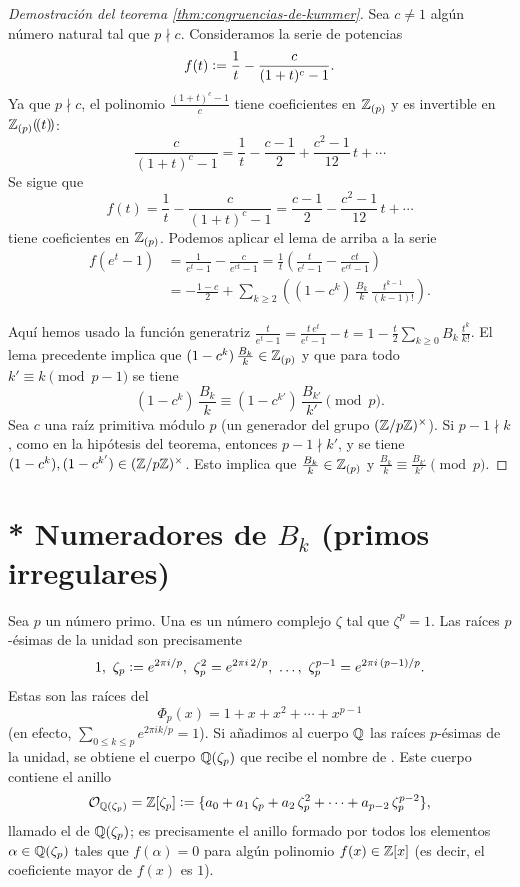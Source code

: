 \documentclass{article}
\numberwithin{equation}{section}
\theoremstyle{definition}
\begin{document}
\begin{proof}[Demostración del teorema \ref{thm:congruencias-de-kummer}]
  Sea $c \ne 1$ algún número natural tal que $p \nmid c$. Consideramos la serie
  de potencias
  $$f (t) \mathrel{\mathop:}= \frac{1}{t} - \frac{c}{(1+t)^c - 1}.$$
  Ya que $p \nmid c$, el polinomio $\frac{(1+t)^c - 1}{c}$ tiene coeficientes en
  $\mathbb{Z}_{(p)}$ y es invertible en $\mathbb{Z}_{(p)} (\!(t)\!)$:
  $$\frac{c}{(1+t)^c - 1} = \frac{1}{t} - \frac{c-1}{2} + \frac{c^2 - 1}{12}\,t + \cdots$$
  Se sigue que
  $$f (t) = \frac{1}{t} - \frac{c}{(1+t)^c - 1} = \frac{c-1}{2} - \frac{c^2 - 1}{12}\,t + \cdots$$
  tiene coeficientes en $\mathbb{Z}_{(p)}$. Podemos aplicar el lema de arriba a la
  serie
  \begin{align*}
    f (e^t - 1) & = \frac{1}{e^t-1} - \frac{c}{e^{ct} - 1}
                  = \frac{1}{t}\left(\frac{t}{e^t-1} - \frac{ct}{e^{ct} - 1}\right) \\
                & = -\frac{1-c}{2} + \sum_{k \ge 2} \left( (1-c^k)\,\frac{B_k}{k} \, \frac{t^{k-1}}{(k-1)!}\right).
  \end{align*}

  Aquí hemos usado la función generatriz
  $\frac{t}{e^t - 1} = \frac{t\,e^t}{e^t-1} - t = 1 - \frac{t}{2} \sum_{k \ge 0} B_k \, \frac{t^k}{k!}$.
  El lema precedente implica que $(1 - c^k)\,\frac{B_k}{k} \in \mathbb{Z}_{(p)}$ y que
  para todo $k' \equiv k \pmod{p-1}$ se tiene
  $$(1-c^k)\,\frac{B_k}{k} \equiv (1-c^{k'})\,\frac{B_{k'}}{k'} \pmod{p}.$$
  Sea $c$ una raíz primitiva módulo $p$ (un generador del grupo
  $(\mathbb{Z}/p\mathbb{Z})^\times$). Si $p-1 \nmid k$, como en la hipótesis del teorema,
  entonces $p-1 \nmid k'$, y se tiene
  $(1-c^k), (1-c^{k'}) \in (\mathbb{Z}/p\mathbb{Z})^\times$. Esto implica que
  $\frac{B_k}{k} \in \mathbb{Z}_{(p)}$ y
  $\frac{B_k}{k} \equiv \frac{B_{k'}}{k'} \pmod{p}$.
\end{proof}


\section{* Numeradores de $B_k$ (primos irregulares)}
\label{sec:primos-irregulares}

Sea $p$ un número primo. Una  es un número
complejo $\zeta$ tal que $\zeta^p = 1$. Las raíces $p$-ésimas de la unidad son
precisamente
$$1, ~ \zeta_p \mathrel{\mathop:}= e^{2\pi i /p}, ~ \zeta_p^2 = e^{2\pi i \, 2/p}, ~ \ldots, ~ \zeta_p^{p-1} = e^{2\pi i \, (p-1)/p}.$$
Estas son las raíces del 
$$\Phi_p (x) = 1 + x + x^2 + \cdots + x^{p-1}$$
(en efecto, $\sum_{0 \le k \le p} e^{2\pi i k/p} = 1$). Si añadimos al cuerpo
$\mathbb{Q}$ las raíces $p$-ésimas de la unidad, se obtiene el cuerpo $\mathbb{Q} (\zeta_p)$
que recibe el nombre de . Este cuerpo contiene el
anillo
$$\mathcal{O}_{\mathbb{Q} (\zeta_p)} = \mathbb{Z} [\zeta_p] \mathrel{\mathop:}= \{ a_0 + a_1\,\zeta_p + a_2\,\zeta_p^2 + \cdots + a_{p-2}\,\zeta_p^{p-2} \},$$
llamado el  de $\mathbb{Q} (\zeta_p)$; es precisamente
el anillo formado por todos los elementos $\alpha \in \mathbb{Q} (\zeta_p)$ tales que
$f (\alpha) = 0$ para algún polinomio  $f (x) \in \mathbb{Z} [x]$ (es
decir, el coeficiente mayor de $f (x)$ es $1$).
\end{document}
